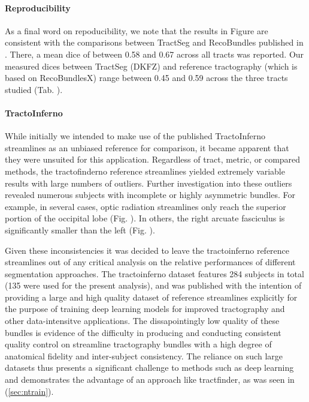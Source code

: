 \paragraph*{Reproducibility}

As a final word on repoducibility, we note that the results in Figure  are consistent with the comparisons between TractSeg and RecoBundles published in \textcite{Wasserthal2018}.
There, a mean \gls{dice} of between 0.58 and 0.67 across all tracts was reported.
Our measured \gls{dice}s between TractSeg (DKFZ) and reference tractography (which is based on RecoBundlesX\autocite{Garyfallidis2018}) range between 0.45 and 0.59 across the three tracts studied (Tab. ).

\paragraph*{TractoInferno}


While initially we intended to make use of the published TractoInferno streamlines as an unbiased reference for comparison, it became apparent that they were unsuited for this application.
Regardless of tract, metric, or compared methods, the tractofinderno reference streamlines yielded extremely variable results with large numbers of outliers.
Further investigation into these outliers revealed numerous subjects with incomplete or highly asymmetric bundles.
For example, in several cases, optic radiation streamlines only reach the superior portion of the occipital lobe (Fig. ).
In others, the right arcuate fasciculus is significantly smaller than the left (Fig. ).

Given these inconsistencies it was decided to leave the tractoinferno reference streamlines out of any critical analysis on the relative performances of different segmentation approaches.
The tractoinferno dataset features 284 subjects in total (135 were used for the present analysis), and was published with the intention of providing a large and high quality dataset of reference streamlines explicitly for the purpose of training deep learning models for improved tractography and other data-intensitve applications.
The dissapointingly low quality of these bundles is evidence of the difficulty in producing and conducting consistent quality control on streamline tractography bundles with a high degree of anatomical fidelity and inter-subject consistency.
The reliance on such large datasets thus presents a significant challenge to methods such as deep learning and demonstrates the advantage of an approach like tractfinder, as was seen in (\ref{sec:ntrain}).

